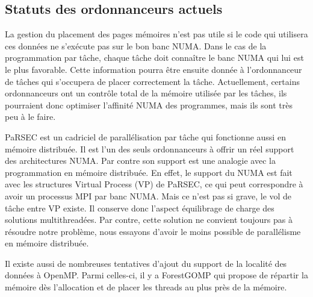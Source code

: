 \subsection{Statuts des ordonnanceurs actuels}
La gestion du placement des pages mémoires n'est pas utile si le code qui utilisera ces données ne s'exécute pas sur le bon banc NUMA.
%
Dans le cas de la programmation par tâche, chaque tâche doit connaître le banc NUMA qui lui est le plus favorable.
%
Cette information pourra être ensuite donnée à l'ordonnanceur de tâches qui s'occupera de placer correctement la tâche.
%
Actuellement, certains ordonnanceurs ont un contrôle total de la mémoire utilisée par les tâches, ils pourraient donc optimiser l'affinité NUMA des programmes, mais ils sont très peu à le faire.


PaRSEC est un cadriciel de parallélisation par tâche qui fonctionne aussi en mémoire distribuée.
%
Il est l'un des seuls ordonnanceurs à offrir un réel support des architectures NUMA.
%
Par contre son support est une analogie avec la programmation en mémoire distribuée.
%
En effet, le support du NUMA est fait avec les structures Virtual Process (VP) de PaRSEC, ce qui peut correspondre à avoir un processus MPI par banc NUMA.
%
Mais ce n'est pas si grave, le vol de tâche entre VP existe.
%
Il conserve donc l'aspect équilibrage de charge des solutions multithreadées.
%
Par contre, cette solution ne convient toujours pas à résoudre notre problème, nous essayons d'avoir le moins possible de parallélisme en mémoire distribuée.


Il existe aussi de nombreuses tentatives d'ajout du support de la localité des données à OpenMP\cite{openmp_numa}.
%
Parmi celles-ci, il y a ForestGOMP\cite{Bro10Thesis} qui propose de répartir la mémoire dès l'allocation et de placer les threads au plus près de la mémoire.
